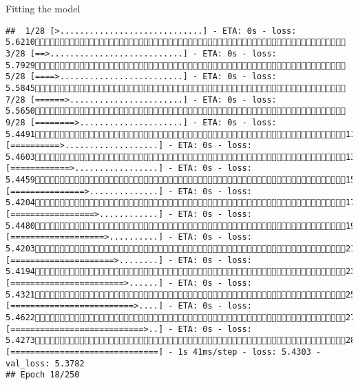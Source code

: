 \documentclass[
  ignorenonframetext,
]{beamer}
\begin{document}
\begin{frame}[fragile]{Fitting the model}
\begin{verbatim}
##  1/28 [>.............................] - ETA: 0s - loss: 5.6210 3/28 [==>...........................] - ETA: 0s - loss: 5.7929 5/28 [====>.........................] - ETA: 0s - loss: 5.5845 7/28 [======>.......................] - ETA: 0s - loss: 5.5650 9/28 [========>.....................] - ETA: 0s - loss: 5.449111/28 [==========>...................] - ETA: 0s - loss: 5.460313/28 [============>.................] - ETA: 0s - loss: 5.445915/28 [===============>..............] - ETA: 0s - loss: 5.420417/28 [=================>............] - ETA: 0s - loss: 5.448019/28 [===================>..........] - ETA: 0s - loss: 5.420321/28 [=====================>........] - ETA: 0s - loss: 5.419423/28 [=======================>......] - ETA: 0s - loss: 5.432125/28 [=========================>....] - ETA: 0s - loss: 5.462227/28 [===========================>..] - ETA: 0s - loss: 5.427328/28 [==============================] - 1s 41ms/step - loss: 5.4303 - val_loss: 5.3782
## Epoch 18/250

\end{verbatim}
\end{frame}
\end{document}
